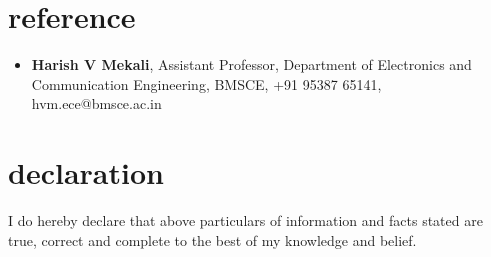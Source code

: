 \documentclass[margin,line]{res}
\begin{document}
\begin{resume}
		\section{\sc reference}
			\begin{itemize}
				\item \textbf{Harish V Mekali}, Assistant Professor, Department of Electronics and Communication Engineering, BMSCE, +91 95387
65141, hvm.ece@bmsce.ac.in
			\end{itemize}

		\section{\sc declaration}

 I do hereby declare that above particulars of information and facts stated are true, correct and complete to the best of my knowledge and belief.



\end{resume}
\end{document}
